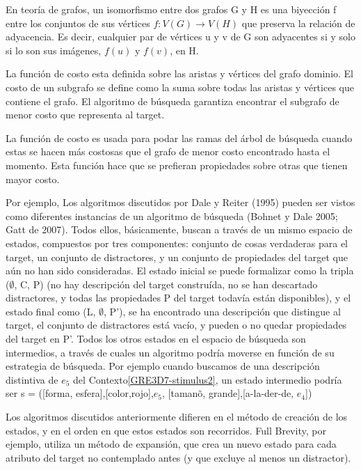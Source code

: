 En teor\'{i}a de grafos, un isomorfismo entre dos grafos G y H es una biyecci\'on f entre los conjuntos de sus v\'ertices $f:V(G) \rightarrow V(H)$ que preserva la relaci\'on de adyacencia. Es decir, cualquier par de v\'ertices u y v de G son adyacentes si y solo si lo son sus im\'agenes, $f(u)$ y $f(v)$, en H.


La funci\'on de costo esta definida sobre las aristas y v\'ertices del grafo dominio. El costo de un subgrafo se define como la suma sobre todas las aristas y v\'ertices que contiene el grafo.
El algoritmo de b\'usqueda garantiza encontrar el subgrafo de menor costo que representa al target.

La funci\'on de costo es usada para podar las ramas del \'arbol de b\'usqueda cuando estas se hacen m\'as costosas que el grafo de menor costo encontrado hasta el momento. Esta funci\'on hace que se prefieran propiedades sobre otras que tienen mayor costo.

Por ejemplo, 
Los algoritmos discutidos por Dale y Reiter (1995) pueden ser vistos como
diferentes instancias de un algoritmo de b\'usqueda (Bohnet y Dale 2005; Gatt de 2007).
Todos ellos, b\'asicamente, buscan a trav\'es de un mismo espacio de estados, compuestos por tres componentes: conjunto de cosas verdaderas para el target, un conjunto de distractores, y un conjunto de propiedades del target que a\'un no han sido consideradas. El estado inicial se puede formalizar como la tripla ($\emptyset$, C, P) 
(no hay descripci\'on del target constru\'ida, no se han descartado distractores, y todas las propiedades P del target todav\'ia est\'an disponibles), y el estado final como
(L, $\emptyset$, P'), se ha encontrado una descripci\'on que distingue al target,
el conjunto de distractores est\'a vac\'io, y pueden o no quedar propiedades del target en P'. Todos los otros estados en el espacio de b\'usqueda son intermedios,
a trav\'es de cuales un algoritmo podr\'ia moverse en funci\'on de su estrategia de b\'usqueda. 
Por ejemplo 
cuando buscamos de una descripci\'on distintiva de $e_{5}$ del Contexto\ref{GRE3D7-stimulus2}, un estado intermedio podr\'ia ser
s = ({[forma, esfera],[color,rojo]},{$e_{5}$}, {[taman\~o, grande],[a-la-der-de, $e_4$]})

Los algoritmos discutidos anteriormente difieren en el m\'etodo de creaci\'on de los estados, y en el orden en que estos estados son recorridos. Full Brevity, por ejemplo, utiliza un m\'etodo de expansi\'on, que crea un nuevo estado para cada atributo
del target no contemplado antes (y que excluye al menos un distractor). 


